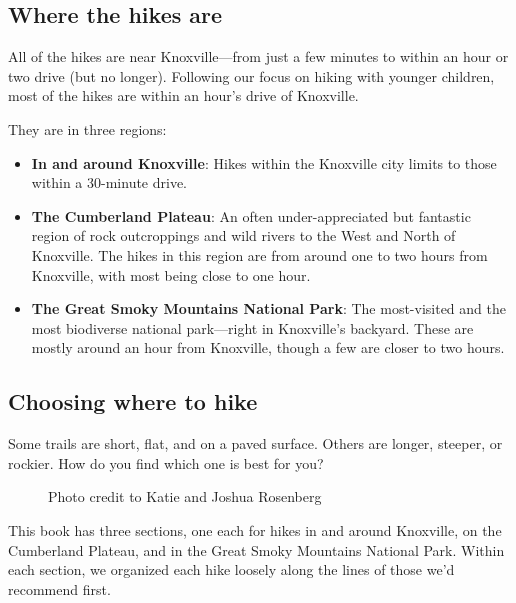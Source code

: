 \documentclass[
  letterpaper,
  DIV=11,
  numbers=noendperiod]{scrreprt}
\makeatletter
\providecommand{\tightlist}{%
  \setlength{\itemsep}{0pt}\setlength{\parskip}{0pt}}\usepackage{longtable,booktabs,array}
\newcommand*\pandocbounded[1]{%
  \sbox\pandoc@box{#1}%
  \Gscale@div\@tempa{\textheight}{\dimexpr\ht\pandoc@box+\dp\pandoc@box\relax}%
  \Gscale@div\@tempb{\linewidth}{\wd\pandoc@box}%
  \ifdim\@tempb\p@<\@tempa\p@\let\@tempa\@tempb\fi%
  \ifdim\@tempa\p@<\p@\scalebox{\@tempa}{\usebox\pandoc@box}%
  \else\usebox{\pandoc@box}%
  \fi%
}
\makeatother
\begin{document}
\subsection{Where the hikes are}\label{where-the-hikes-are}

All of the hikes are near Knoxville---from just a few minutes to within
an hour or two drive (but no longer). Following our focus on hiking with
younger children, most of the hikes are within an hour's drive of
Knoxville.

They are in three regions:

\begin{itemize}
\tightlist
\item
  \textbf{In and around Knoxville}: Hikes within the Knoxville city
  limits to those within a 30-minute drive.
\item
  \textbf{The Cumberland Plateau}: An often under-appreciated but
  fantastic region of rock outcroppings and wild rivers to the West and
  North of Knoxville. The hikes in this region are from around one to
  two hours from Knoxville, with most being close to one hour.
\item
  \textbf{The Great Smoky Mountains National Park}: The most-visited and
  the most biodiverse national park---right in Knoxville's backyard.
  These are mostly around an hour from Knoxville, though a few are
  closer to two hours.
\end{itemize}

\subsection{Choosing where to hike}\label{choosing-where-to-hike}

Some trails are short, flat, and on a paved surface. Others are longer,
steeper, or rockier. How do you find which one is best for you?

\begin{figure}[H]

{\centering \pandocbounded{\texttt{[image: img/rocky trail.jpg]}}

}

\caption{Photo credit to Katie and Joshua Rosenberg}

\end{figure}%

This book has three sections, one each for hikes in and around
Knoxville, on the Cumberland Plateau, and in the Great Smoky Mountains
National Park. Within each section, we organized each hike loosely along
the lines of those we'd recommend first.
\end{document}
